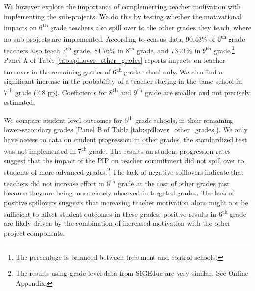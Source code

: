 \documentclass[11pt,a4paper]{article}
\begin{document}
We however explore the importance of complementing teacher motivation with implementing the sub-projects. We do this by testing whether the motivational impacts on 6\textsuperscript{th} grade teachers also spill over to the other grades they teach, where no sub-projects are implemented. According to census data, 90.43\% of 6\textsuperscript{th} grade teachers also teach 7\textsuperscript{th} grade, 81.76\% in 8\textsuperscript{th} grade, and 73.21\% in 9\textsuperscript{th} grade.\footnote{The percentage is balanced between treatment and control schools.} Panel A of Table \ref{tab:spillover_other_grades} reports impacts on teacher turnover in the remaining grades of 6\textsuperscript{th} grade school only. We also find a significant increase in the probability of a teacher staying in the same school in 7\textsuperscript{th} grade (7.8 pp). Coefficients for 8\textsuperscript{th} and 9\textsuperscript{th} grade are smaller and not precisely estimated.

We compare student level outcomes for 6\textsuperscript{th} grade schools, in their remaining lower-secondary grades (Panel B of Table \ref{tab:spillover_other_grades}). We only have access to data on student progression in other grades, the standardized test was not implemented in 7\textsuperscript{th} grade. The results on student progression rates suggest that the impact of the PIP on teacher commitment did not spill over to students of more advanced grades.\footnote{The results using grade level data from SIGEduc are very similar. See Online Appendix.} The lack of negative spillovers indicate that teachers did not increase effort in 6\textsuperscript{th} grade at the cost of other grades just because they are being more closely observed in targeted grades. The lack of positive spillovers suggests that increasing teacher motivation alone might not be sufficient to affect student outcomes in these grades: positive results in 6\textsuperscript{th} grade are likely driven by the combination of increased motivation with the other project components. 
\end{document}
